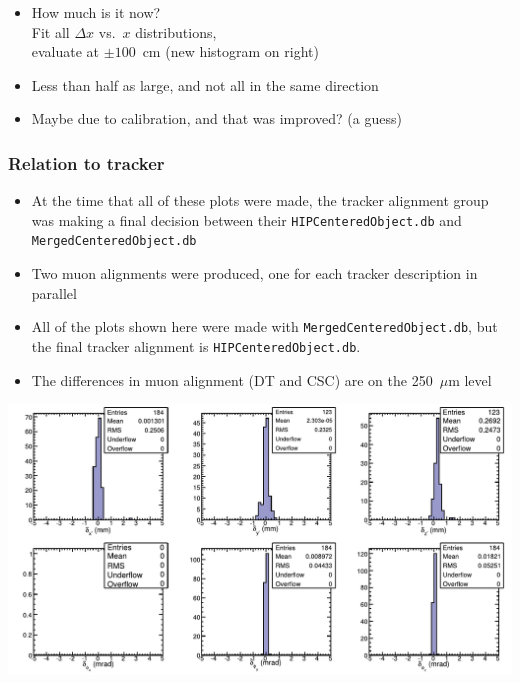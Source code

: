 \documentclass[compress]{beamer}
\begin{document}
\begin{frame}
\begin{itemize}
\item How much is it now?  \\ Fit all $\Delta x$ vs.\ $x$ distributions, \\ evaluate at $\pm 100$~cm (new histogram on right)

\item Less than half as large, and not all in the same direction

\item Maybe due to calibration, and that was improved?  (a guess)
\end{itemize}
\end{frame}

\begin{frame}
\frametitle{Relation to tracker}

\scriptsize
\begin{itemize}
\item \scriptsize At the time that all of these plots were made, the tracker
  alignment group was making a final decision between their
  {\tiny \tt HIPCenteredObject.db} and \mbox{\tiny \tt MergedCenteredObject.db\hspace{-1 cm}}
\item \scriptsize Two muon alignments were produced, one for each tracker description in parallel
\item \scriptsize All of the plots shown here were made with
  {\tiny \tt MergedCenteredObject.db}, but the final tracker alignment is
  {\tiny \tt HIPCenteredObject.db}.
\item \scriptsize The differences in muon alignment (DT and CSC) are on the 250~$\mu$m level
\end{itemize}

\includegraphics[width=\linewidth]{trackerdiff_DT.pdf}
\end{frame}
\end{document}
